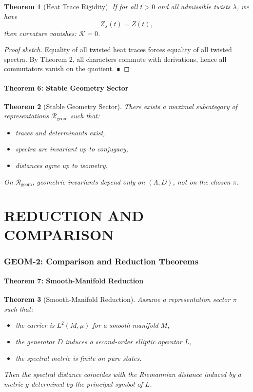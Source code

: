 \documentclass[12pt, oneside]{article}
\newtheorem{theorem}{Theorem}[section]
\begin{document}
\begin{theorem}[Heat Trace Rigidity]
If for all $t > 0$ and all admissible twists $\lambda$, we have
\[
Z_\lambda(t) = Z(t),
\]
then curvature vanishes: $\mathcal{K} = 0$.
\end{theorem}

\begin{proof}[Proof sketch]
Equality of all twisted heat traces forces equality of all twisted spectra. By Theorem 2, all characters commute with derivations, hence all commutators vanish on the quotient. ∎
\end{proof}

\subsection{Theorem 6: Stable Geometry Sector}

\begin{theorem}[Stable Geometry Sector]
There exists a maximal subcategory of representations $\mathcal{R}_{\mathrm{geom}}$ such that:
\begin{itemize}
    \item traces and determinants exist,
    \item spectra are invariant up to conjugacy,
    \item distances agree up to isometry.
\end{itemize}
On $\mathcal{R}_{\mathrm{geom}}$, geometric invariants depend only on $(\Lambda, D)$, not on the chosen $\pi$.
\end{theorem}

\part{REDUCTION AND COMPARISON}

\section{GEOM-2: Comparison and Reduction Theorems}

\subsection{Theorem 7: Smooth-Manifold Reduction}

\begin{theorem}[Smooth-Manifold Reduction]
Assume a representation sector $\pi$ such that:
\begin{itemize}
    \item the carrier is $L^2(M,\mu)$ for a smooth manifold $M$,
    \item the generator $D$ induces a second-order elliptic operator $L$,
    \item the spectral metric is finite on pure states.
\end{itemize}
Then the spectral distance coincides with the Riemannian distance induced by a metric $g$ determined by the principal symbol of $L$.
\end{theorem}
\end{document}

